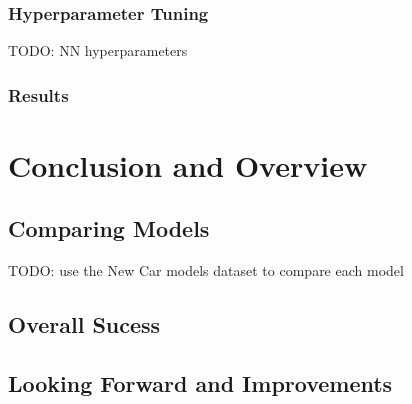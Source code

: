 \documentclass[12pt,twocolumn]{article}
\begin{document}
\subsubsection{Hyperparameter Tuning}
TODO: NN hyperparameters

\subsubsection{Results}

\section{Conclusion and Overview}
\subsection{Comparing Models}
TODO: use the New Car models dataset to compare each model

\subsection{Overall Sucess}

\subsection{Looking Forward and Improvements}
\end{document}
